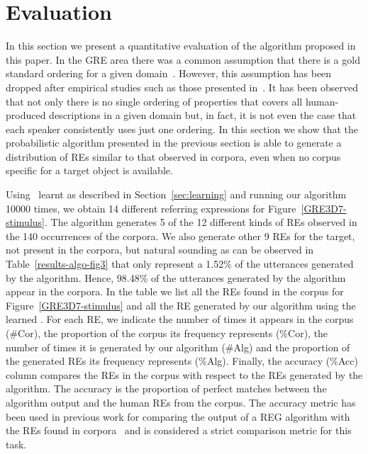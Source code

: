 \section{Evaluation}\label{sec:evaluation}

In this section we present a quantitative evaluation of the algorithm proposed in this paper. In the GRE area there was a common assumption that there is a gold standard ordering for a given domain~\cite{Dale1995}. However, this assumption has been dropped after empirical studies such as those presented in~\cite{arec2:2008:Areces,viet:gene11}. It has been observed that not only there is no single ordering of properties that covers all human-produced descriptions in a given domain but, in fact, it is not even the case that each speaker consistently uses just one ordering. In this section we show that the probabilistic algorithm presented in the previous section is able to generate a distribution of REs similar to that observed in corpora, even when no corpus specific for a target object is available. 

Using \puse\ learnt as described in Section~\ref{sec:learning} and running our algorithm 10000 times, we obtain 14 different referring expressions for Figure~\ref{GRE3D7-stimulus}. The algorithm generates 5 of the 12 different kinds of REs observed in the 140 occurrences of the corpora. We also generate other 9 REs for the target, not present in the corpora, but natural sounding as can be observed in Table~\ref{results-algo-fig3} that only represent a 1.52\% of the utterances generated by the algorithm. Hence, 98.48\% of the utterances generated by the algorithm appear in the corpora. In the table we list all the REs found in the corpus for Figure~\ref{GRE3D7-stimulus} and all the RE generated by our algorithm using the learned \puse. For each RE, we indicate the number of times it appears in the corpus (\#Cor), the proportion of the corpus its frequency represents (\%Cor), the number of times it is generated by our algorithm (\#Alg) and the proportion of the generated REs its frequency represents (\%Alg). Finally, the accuracy (\%Acc) column compares the REs in the corpus with respect to the REs generated by the algorithm. The accuracy is the proportion of perfect matches between the algorithm output and the human REs from the corpus. The accuracy metric has been used in previous work for comparing the output of a REG algorithm with the REs found in corpora~\cite{sluis07:eval,viet:gene11} and is considered a strict comparison metric for this task. 

